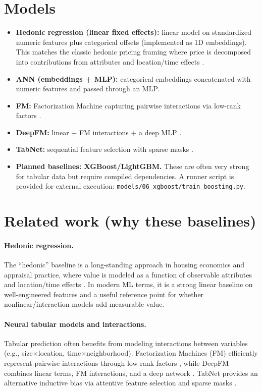 \documentclass[11pt]{article}
\begin{document}
\section{Models}
\begin{itemize}[leftmargin=*]
  \item \textbf{Hedonic regression (linear fixed effects):} linear model on standardized numeric features plus categorical offsets (implemented as 1D embeddings). This matches the classic hedonic pricing framing where price is decomposed into contributions from attributes and location/time effects \cite{rosen1974hedonic}.
  \item \textbf{ANN (embeddings + MLP):} categorical embeddings concatenated with numeric features and passed through an MLP.
  \item \textbf{FM:} Factorization Machine capturing pairwise interactions via low-rank factors \cite{rendle2010fm}.
  \item \textbf{DeepFM:} linear + FM interactions + a deep MLP \cite{guo2017deepfm}.
  \item \textbf{TabNet:} sequential feature selection with sparse masks \cite{arik2019tabnet}.
  \item \textbf{Planned baselines: XGBoost/LightGBM.} These are often very strong for tabular data \cite{chen2016xgboost,ke2017lightgbm} but require compiled dependencies. A runner script is provided for external execution: \texttt{models/06\_xgboost/train\_boosting.py}.
\end{itemize}

\section{Related work (why these baselines)}
\paragraph{Hedonic regression.}
The ``hedonic'' baseline is a long-standing approach in housing economics and appraisal practice, where value is modeled as a function of observable attributes and location/time effects \cite{rosen1974hedonic}. In modern ML terms, it is a strong linear baseline on well-engineered features and a useful reference point for whether nonlinear/interaction models add measurable value.

\paragraph{Neural tabular models and interactions.}
Tabular prediction often benefits from modeling interactions between variables (e.g., size$\times$location, time$\times$neighborhood). Factorization Machines (FM) efficiently represent pairwise interactions through low-rank factors \cite{rendle2010fm}, while DeepFM combines linear terms, FM interactions, and a deep network \cite{guo2017deepfm}. TabNet provides an alternative inductive bias via attentive feature selection and sparse masks \cite{arik2019tabnet}.
\end{document}
